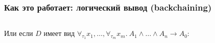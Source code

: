 \documentclass{beamer}
\begin{document}
\begin{frame}[fragile]
  \frametitle{Как это работает: логический вывод (backchaining)}
\begin{columns}
  \begin{column}{0.25\textwidth}
  \end{column}

  \begin{column}{0.25\textwidth}
  \end{column}

  \begin{column}{0.4\textwidth}
  \end{column}
\end{columns}

\vspace{1cm}


\begin{columns}
  \begin{column}{0.25\textwidth}
  \end{column}

  \begin{column}{0.25\textwidth}
  \end{column}

  \begin{column}{0.4\textwidth}
  \end{column}
\end{columns}

\vspace{1cm}


\begin{center}
  Или если $D$ имеет вид $\forall_{\tau_1} x_1, \dots, \forall_{\tau_m} x_m. \ A_1 \wedge \dots \wedge A_n \to A_0$:
\end{center}

\begin{center}
  \begin{minipage}{0.5\textwidth}

  \end{minipage}
\end{center}
\end{frame}
\end{document}
